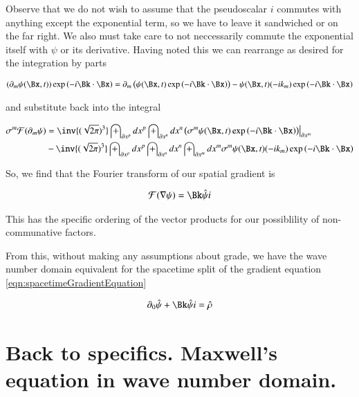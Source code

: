 \documentclass{article}
\newcommand{\FF}[0]{\mathcal{F}}
\begin{document}
Observe that we do not wish to assume that the pseudoscalar $i$ commutes with anything except the exponential term, so we have to leave
it sandwiched or on the far right.  We also must take care to not neccessarily commute the exponential itself with $\psi$ or its derivative.
Having noted this we can rearrange as desired for the integration by parts

\begin{align*}
(\partial_m \psi(\Bx, t)) \exp\left( -i \Bk \cdot \Bx \right)
&=
\partial_m \left( \psi(\Bx, t) \exp\left( -i \Bk \cdot \Bx \right) \right) - \psi(\Bx, t) ( -i k_m ) \exp\left( -i \Bk \cdot \Bx \right) \\
\end{align*}

and substitute back into the integral

\begin{align*}
\sigma^m \FF(\partial_m \psi) 
&= 
\inv{(\sqrt{2\pi})^3} 
\int_{\partial x^p} dx^p
\int_{\partial x^n} dx^n
{\left. {\left(\sigma^m \psi(\Bx, t) \exp\left( -i \Bk \cdot \Bx \right) \right)} \right\vert}_{\partial x^m} \\
&- 
\inv{(\sqrt{2\pi})^3} 
\int_{\partial x^p} dx^p
\int_{\partial x^n} dx^n
\int_{\partial x^m} dx^m
\sigma^m \psi(\Bx, t) ( -i k_m )
\exp\left( -i \Bk \cdot \Bx \right) 
\\
\end{align*}

So, we find that the Fourier transform of our spatial gradient is

\begin{align*}
\FF(\grad \psi) = \Bk \hat{\psi} i
\end{align*}

This has the specific ordering of the vector products for our possiblility of non-communative factors.

From this, without making any assumptions about grade, we have the wave number domain equivalent
for the spacetime split of the gradient equation \ref{eqn:spacetimeGradientEquation}

\begin{align}\label{eqn:waveDomainGeneral}
\partial_0 \hat{\psi} + \Bk \hat{\psi} i = \hat{\rho}
\end{align}

\section{ Back to specifics.  Maxwell's equation in wave number domain. }
\end{document}
